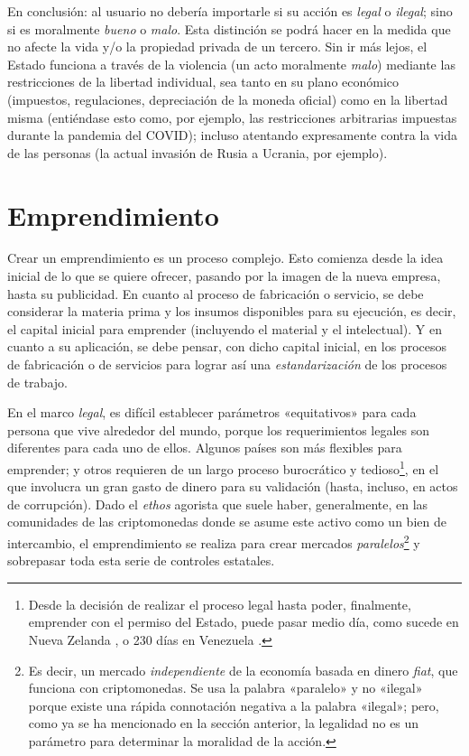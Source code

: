 \documentclass[12pt,a4paper]{article}
\begin{document}
En conclusión: al usuario no debería importarle si su acción es \textit{legal} o \textit{ilegal}; sino si es moralmente \textit{bueno} o \textit{malo}. Esta distinción se podrá hacer en la medida que no afecte la vida y/o la propiedad privada de un tercero. Sin ir más lejos, el Estado funciona a través de la violencia (un acto moralmente \textit{malo}) mediante las restricciones de la libertad individual, sea tanto en su plano económico (impuestos, regulaciones, depreciación de la moneda oficial) como en la libertad misma (entiéndase esto como, por ejemplo, las restricciones arbitrarias impuestas durante la pandemia del COVID); incluso atentando expresamente contra la vida de las personas (la actual invasión de Rusia a Ucrania, por ejemplo).

\section{Emprendimiento}
Crear un emprendimiento es un proceso complejo. Esto comienza desde la idea inicial de lo que se quiere ofrecer, pasando por la imagen de la nueva empresa, hasta su publicidad. En cuanto al proceso de fabricación o servicio, se debe considerar la materia prima y los insumos disponibles para su ejecución, es decir, el capital inicial para emprender (incluyendo el material y el intelectual). Y en cuanto a su aplicación, se debe pensar, con dicho capital inicial, en los procesos de fabricación o de servicios para lograr así una \textit{estandarización} de los procesos de trabajo.

En el marco \textit{legal}, es difícil establecer parámetros «equitativos» para cada persona que vive alrededor del mundo, porque los requerimientos legales son diferentes para cada uno de ellos. Algunos países son más flexibles para emprender; y otros requieren de un largo proceso burocrático y tedioso\footnote{Desde la decisión de realizar el proceso legal hasta poder, finalmente, emprender con el permiso del Estado, puede pasar medio día, como sucede en Nueva Zelanda \cite[pág~4]{db:nuevazelanda}, o 230 días en Venezuela \cite[pág~4]{db:venezuela}.}, en el que involucra un gran gasto de dinero para su validación (hasta, incluso, en actos de corrupción). Dado el \textit{ethos} agorista que suele haber, generalmente, en las comunidades de las criptomonedas donde se asume este activo como un bien de intercambio, el emprendimiento se realiza para crear mercados \textit{paralelos}\footnote{Es decir, un mercado \textit{independiente} de la economía basada en dinero \textit{fiat}, que funciona con criptomonedas. Se usa la palabra «paralelo» y no «ilegal» porque existe una rápida connotación negativa a la palabra «ilegal»; pero, como ya se ha mencionado en la sección anterior, la legalidad no es un parámetro para determinar la moralidad de la acción.} y sobrepasar toda esta serie de controles estatales.
\end{document}
